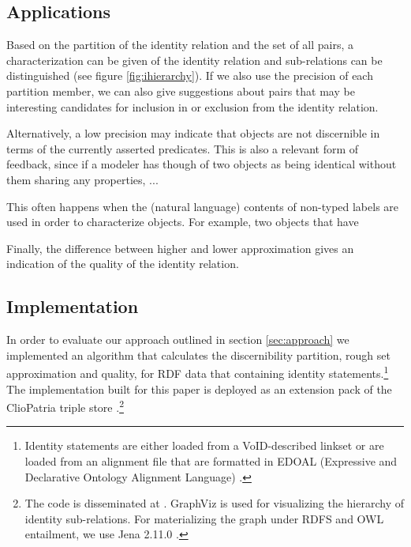 \subsection{Applications}
\label{sec:applications}

Based on the partition of the identity relation and the set of all pairs,
  a characterization can be given of the identity relation
  and sub-relations can be distinguished (see figure \ref{fig:ihierarchy}).
If we also use the precision of each partition member,
  we can also give suggestions about pairs that may be interesting candidates
  for inclusion in or exclusion from the identity relation.

Alternatively, a low precision may indicate that objects are not
  discernible in terms of the currently asserted predicates.
This is also a relevant form of feedback,
  since if a modeler has though of two objects as being identical
  without them sharing any properties, ...

This often happens when the (natural language) contents of non-typed labels
  are used in order to characterize objects.
For example, two objects that have 

Finally, the difference between higher and lower approximation
  gives an indication of the quality of the identity relation.



\subsection{Implementation}
\label{sec:implementation}

In order to evaluate our approach outlined in section \ref{sec:approach}
  we implemented an algorithm that calculates
  the discernibility partition, rough set approximation and quality,
  for RDF data that containing identity statements.\footnote{
      Identity statements are either loaded from a VoID-described
        linkset \cite{Void2011}
        or are loaded from an alignment file that are formatted in
        EDOAL (Expressive and Declarative Ontology Alignment Language)
        \cite{DavidEzenatScharffeTrojahn2011}.
    }
The implementation built for this paper is deployed as an extension pack
  of the ClioPatria triple store .\footnote{
      The code is disseminated at .
      GraphViz is used for visualizing the hierarchy of
        identity sub-relations.
      For materializing the graph under RDFS and OWL entailment,
        we use Jena 2.11.0 \cite{Carroll2004}.
    }

